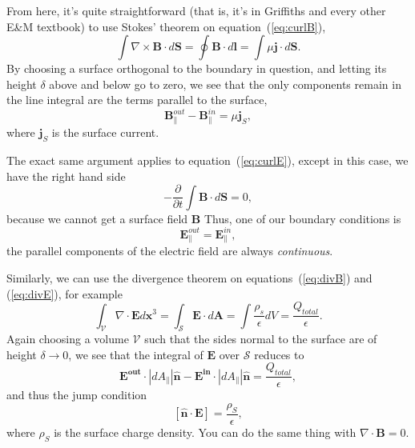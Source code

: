 \documentclass[11pt]{article}
\newcommand{\vol}{\mathcal{V}}
\newcommand{\surf}{\mathcal{S}}
\newcommand{\norm}{\hat{\mathbf{n}}}
\begin{document}
From here, it's quite straightforward (that is, it's in Griffiths and every other E\&M textbook) to use Stokes' theorem on equation~(\ref{eq:curlB}),
\begin{equation}
  \label{eq:integrate_curlB}
  \int \nabla \times \mathbf{B}\cdot d\mathbf{S} = \oint \mathbf{B}\cdot d\mathbf{l} = \int \mu \mathbf{j} \cdot d\mathbf{S}.
\end{equation}
By choosing a surface orthogonal to the boundary in question, and letting its height $\delta$ above and below go to zero, we see that the only components remain in the line integral are the terms parallel to the surface,
\begin{equation}
  \label{eq:B_parallel}
  \mathbf{B}^{out}_\parallel - \mathbf{B}^{in}_\parallel = \mu \mathbf{j}_S,
\end{equation}
where $\mathbf{j}_S$ is the surface current.

The exact same argument applies to equation~(\ref{eq:curlE}), except in this case, we have the right hand side
\begin{equation}
  \label{eq:curl_E_RHS}
  -\frac{\partial}{\partial t} \int \mathbf{B} \cdot d\mathbf{S} = 0,
\end{equation}
because we cannot get a surface field $\mathbf{B}$
Thus, one of our boundary conditions is
\begin{equation}
  \label{eq:E_BC}
  \mathbf{E}^{out}_\parallel = \mathbf{E}^{in}_\parallel,
\end{equation}
the parallel components of the electric field are always \emph{continuous}.

Similarly, we can use the divergence theorem on equations~(\ref{eq:divB}) and (\ref{eq:divE}), for example
\begin{equation}
  \label{eq:div_thm_E}
  \int_{\vol} \nabla \cdot \mathbf{E} d\mathbf{x}^3 = \int_{\surf} \mathbf{E}\cdot d\mathbf{A} = \int \frac{\rho_s}{\epsilon} dV = \frac{Q_{total}}{\epsilon}.
\end{equation}
Again choosing a volume $\vol$ such that the sides normal to the surface are of height $\delta \to 0$, we see that the integral of $\mathbf{E}$ over $\surf$ reduces to
\begin{equation}
  \label{eq:parallel_E}
  \mathbf{E^{out}} \cdot |dA_\parallel| \norm -   \mathbf{E^{in}} \cdot |dA_\parallel| \norm = \frac{Q_{total}}{\epsilon},
\end{equation}
and thus the jump condition
\begin{equation}
  \label{eq:parallel_E_jump}
  [ \norm \cdot \mathbf{E}] = \frac{\rho_{S}}{\epsilon},
\end{equation}
where $\rho_{S}$ is the surface charge density.
You can do the same thing with $\nabla \cdot \mathbf{B} = 0$.
\end{document}
